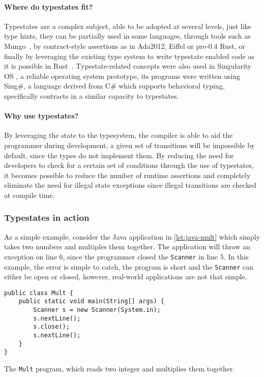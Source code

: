 \paragraph{Where do typestates fit?}
Typestates are a complex subject, able to be adopted at several levels,
just like type hints, they can be partially used in some languages,
through tools such as Mungo~\autocite{Voinea2020},
by contract-style assertions as in Ada2012, Eiffel or pre-0.4 Rust,
or finally by leveraging the existing type system to write typestate enabled code as it is possible in
Rust~\autocite{Duarte2020}.
Typestate-related concepts were also used in Singularity OS \autocite[Section 6]{Ancona2016}, a reliable operating system prototype,
its programs were written using Sing\#, a language derived from C\# which supports behavioral typing,
specifically contracts in a similar capacity to typestates.

\paragraph{Why use typestates?}
By leveraging the state to the typesystem, the compiler is able to aid the programmer during development,
a given set of transitions will be impossible by default, since the types do not implement them. %
By reducing the need for developers to check for a certain set of conditions through the use of typestates,
it becomes possible to reduce the number of runtime assertions and
completely eliminate the need for illegal state exceptions since illegal transitions are checked at compile time.


\subsubsection*{Typestates in action}

As a simple example, consider the Java application in \autoref{lst:java-mult} which simply takes two numbers and multiples them together.
The application will throw an exception on line 6,
since the programmer closed the \texttt{Scanner} in line 5.
In this example, the error is simple to catch,
the program is short and the \texttt{Scanner} can either be open or closed,
however, real-world applications are not that simple.

\begin{listing}
    \centering
    \begin{verbatim}
public class Mult {
    public static void main(String[] args) {
        Scanner s = new Scanner(System.in);
        s.nextLine();
        s.close();
        s.nextLine();
    }
}
    \end{verbatim}
    \caption{The \texttt{Mult} program, which reads two integer and multiplies them together.}
    \label{lst:java-mult}
\end{listing}

